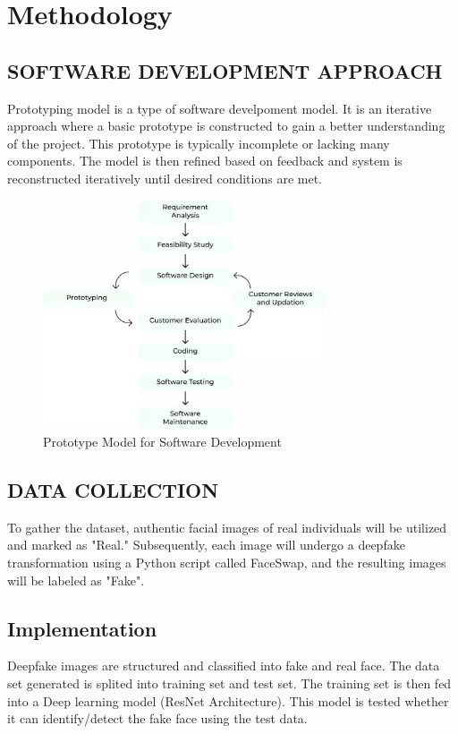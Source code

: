     \chapter{Methodology}
       \section{SOFTWARE DEVELOPMENT APPROACH}
        Prototyping model is a type of software develpoment model. It is an iterative approach where a basic prototype is constructed to gain a better understanding of the project. This prototype is typically incomplete or lacking many components. The model is then refined based on feedback and system is reconstructed iteratively until desired conditions are met.
         \begin{figure}[hbt!]
            \centering
                \includegraphics[width=0.75\textwidth]{./img/prototype model.png}
                \caption{Prototype Model for Software Development}
        \end{figure}
        \section{DATA COLLECTION}
        To gather the dataset, authentic facial images of real individuals will be utilized and marked as "Real." Subsequently, each image will undergo a deepfake transformation using a Python script called FaceSwap, and the resulting images will be labeled as "Fake".
    
        \section{Implementation}
        Deepfake images are structured and classified into fake and real face. The data set generated is splited into training set and test set. The training set is then fed into a Deep learning model (ResNet Architecture). This model is tested whether it can identify/detect the fake face using the test data.


